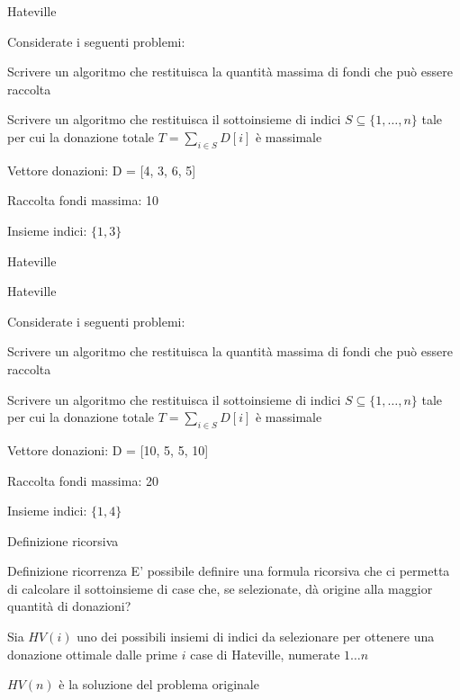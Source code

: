 \begin{frame}{Hateville}

Considerate i seguenti problemi:
\BIL
\item Scrivere un algoritmo che restituisca la quantità massima di
fondi che può essere raccolta
\item Scrivere un algoritmo che restituisca il sottoinsieme di indici 
$S \subseteq \{ 1, \ldots, n \}$ tale per cui la donazione totale
$T = \sum_{i \in S} D[i]$ è massimale
\EIL

\bigskip
{}
\BIL
\item Vettore donazioni: \textsf{D = [4, 3, 6, 5]}
\item Raccolta fondi massima: 10
\item Insieme indici: $\{1, 3\}$
\EIL

\end{frame}

\begin{frame}{Hateville}

\bigskip
{}

\end{frame}

\begin{frame}{Hateville}

Considerate i seguenti problemi:
\BIL
\item Scrivere un algoritmo che restituisca la quantità massima di
fondi che può essere raccolta
\item Scrivere un algoritmo che restituisca il sottoinsieme di indici 
$S \subseteq \{ 1, \ldots, n \}$ tale per cui la donazione totale
$T = \sum_{i \in S} D[i]$ è massimale
\EIL

\bigskip
{}
\BIL
\item Vettore donazioni: \textsf{D = [10, 5, 5, 10]}
\item Raccolta fondi massima: 20
\item Insieme indici: $\{1, 4\}$
\EIL

\end{frame}


\begin{frame}{Definizione ricorsiva}

\begin{block}{Definizione ricorrenza}
E' possibile definire una formula ricorsiva che ci permetta di calcolare
il sottoinsieme di case che, se selezionate, dà origine alla maggior quantità di donazioni?
\end{block}

\bigskip
{}
\BIL
\item Sia $HV(i)$ uno dei possibili insiemi di indici da selezionare per ottenere una donazione ottimale dalle prime $i$ case di Hateville, numerate $1 \ldots n$ 
\item $HV(n)$ è la soluzione del problema originale
\EIL

\end{frame}


